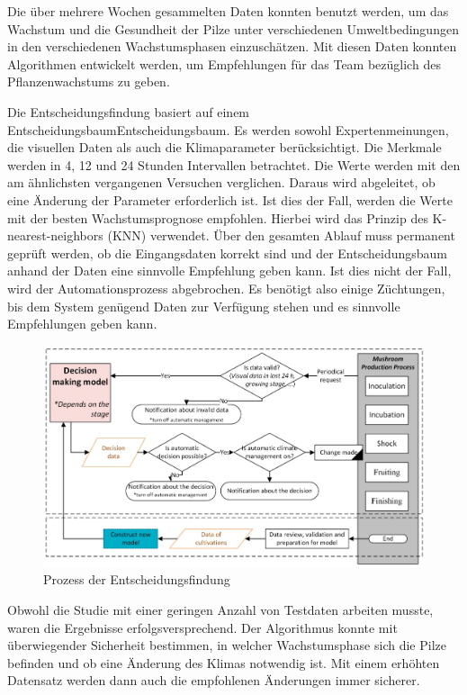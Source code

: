 Die über mehrere Wochen gesammelten Daten konnten benutzt werden, um das Wachstum und die Gesundheit der Pilze unter verschiedenen Umweltbedingungen in den verschiedenen Wachstumsphasen einzuschätzen. Mit diesen Daten konnten Algorithmen entwickelt werden, um Empfehlungen für das Team bezüglich des Pflanzenwachstums zu geben.

Die Entscheidungsfindung basiert auf einem Entscheidungsbaum\gls{Entscheidungsbaum}. Es werden sowohl Expertenmeinungen, die visuellen Daten als auch die Klimaparameter berücksichtigt. Die Merkmale werden in 4, 12 und 24 Stunden Intervallen betrachtet. Die Werte werden mit den am ähnlichsten vergangenen Versuchen verglichen. Daraus wird abgeleitet, ob eine Änderung der Parameter erforderlich ist. Ist dies der Fall, werden die Werte mit der besten Wachstumsprognose empfohlen. Hierbei wird das Prinzip des K-nearest-neighbors (KNN) verwendet. Über den gesamten Ablauf muss permanent geprüft werden, ob die Eingangsdaten korrekt sind und der Entscheidungsbaum anhand der Daten eine sinnvolle Empfehlung geben kann. Ist dies nicht der Fall, wird der Automationsprozess abgebrochen. Es benötigt also einige Züchtungen, bis dem System genügend Daten zur Verfügung stehen und es sinnvolle Empfehlungen geben kann.

\begin{figure}[H]
\centering
\includegraphics[width=\textwidth]{images/decisionTree.png}
\caption{Prozess der Entscheidungsfindung\cite{barauskas2022approach}}
\label{fig:mushroomDiagramm}
\end{figure}

Obwohl die Studie mit einer geringen Anzahl von Testdaten arbeiten musste, waren die Ergebnisse erfolgsversprechend. Der Algorithmus konnte mit überwiegender Sicherheit bestimmen, in welcher Wachstumsphase sich die Pilze befinden und ob eine Änderung des Klimas notwendig ist. Mit einem erhöhten Datensatz werden dann auch die empfohlenen Änderungen immer sicherer.


